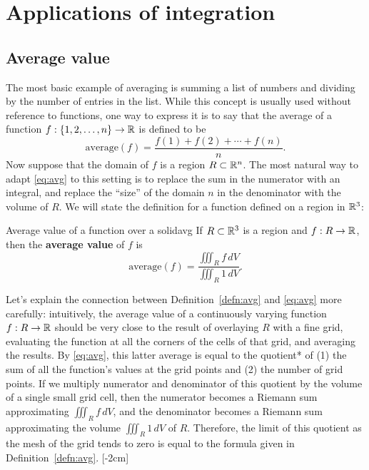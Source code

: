 \documentclass{watsonbook}
\begin{document}
\section{Applications of integration} \label{sec:applications}

\subsection{Average value}

The most basic example of averaging is summing a list of numbers and
dividing by the number of entries in the list. While this concept is
usually used without reference to functions, one way to express it is
to say that the average of a function
$f:\{1,2,\ldots,n\} \rightarrow \mathbb{R}$ is defined to be
\begin{equation} \label{eq:avg} 
  \mathrm{average}(f) = \frac{f(1) + f(2) + \cdots + f(n)}{n}. 
\end{equation}
Now suppose that the domain of $f$ is a region $R\subset \mathbb{R}^n$. The
most natural way to adapt \eqref{eq:avg} to this setting is to replace
the sum in the numerator with an integral, and replace the ``size'' of
the domain $n$ in the denominator with the volume of $R$. We will
state the definition for a function defined on a region in $\mathbb{R}^3$:

\begin{defn}{Average value of a function over a solid}{avg}
  If $R\subset \mathbb{R}^3$ is a region and $f: R \to \mathbb{R}$, then the \textbf{average value} of $f$ is
  \[
    \mathrm{average}(f) = \frac{\displaystyle{\iiint_R f \,
        dV}}{\displaystyle{\iiint_R 1 \, dV}}.
  \]
\end{defn}

Let's explain the connection between Definition~\ref{defn:avg} and
\eqref{eq:avg} more carefully: intuitively, the average value of a
continuously varying function $f:R\to \mathbb{R}$ should be very close to the
result of overlaying $R$ with a fine grid, evaluating the function at
all the corners of the cells of that grid, and averaging the
results. By \eqref{eq:avg}, this latter average is equal to the
quotient* of (1) the sum of all the function's values at the grid
points and (2) the number of grid points. If we multiply numerator and
denominator of this quotient by the volume of a single small grid
cell, then the numerator becomes a Riemann sum approximating
$\iiint_R f \, dV$, and the denominator becomes a Riemann sum
approximating the volume $\iiint_R 1 \, dV$ of $R$. Therefore, the
limit of this quotient as the mesh of the grid tends to zero is equal
to the formula given in Definition~\ref{defn:avg}. [-2cm]
\end{document}
